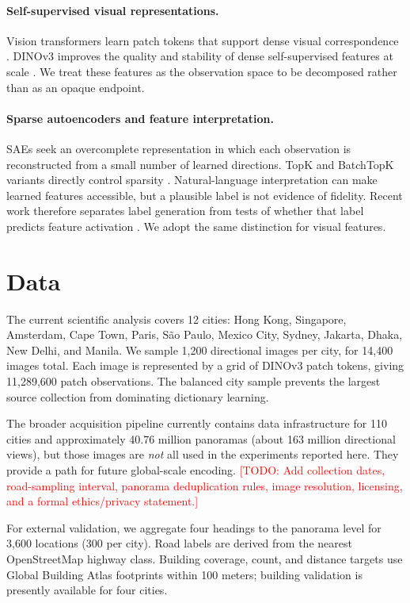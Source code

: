 \documentclass[10pt]{article}
\newcommand{\todo}[1]{\textcolor{red}{[TODO: #1]}}
\begin{document}
\paragraph{Self-supervised visual representations.}
Vision transformers learn patch tokens that support dense visual correspondence
\cite{dosovitskiy2021vit,caron2021dino}. DINOv3 improves the quality and stability
of dense self-supervised features at scale \cite{simeoni2025dinov3}. We treat these
features as the observation space to be decomposed rather than as an opaque endpoint.

\paragraph{Sparse autoencoders and feature interpretation.}
SAEs seek an overcomplete representation in which each observation is reconstructed
from a small number of learned directions. TopK and BatchTopK variants directly
control sparsity \cite{gao2024scaling,bussmann2024batchtopk}. Natural-language
interpretation can make learned features accessible, but a plausible label is not
evidence of fidelity. Recent work therefore separates label generation from tests of
whether that label predicts feature activation \cite{movva2025hypothesaes}. We adopt
the same distinction for visual features.

\section{Data}
The current scientific analysis covers 12 cities: Hong Kong, Singapore, Amsterdam,
Cape Town, Paris, S\~ao Paulo, Mexico City, Sydney, Jakarta, Dhaka, New Delhi, and
Manila. We sample 1,200 directional images per city, for 14,400 images total. Each
image is represented by a grid of DINOv3 patch tokens, giving 11,289,600 patch
observations. The balanced city sample prevents the largest source collection from
dominating dictionary learning.

The broader acquisition pipeline currently contains data infrastructure for 110
cities and approximately 40.76 million panoramas (about 163 million directional
views), but those images are \emph{not} all used in the experiments reported here.
They provide a path for future global-scale encoding. \todo{Add collection dates,
road-sampling interval, panorama deduplication rules, image resolution, licensing,
and a formal ethics/privacy statement.}

For external validation, we aggregate four headings to the panorama level for 3,600
locations (300 per city). Road labels are derived from the nearest OpenStreetMap
highway class. Building coverage, count, and distance targets use Global Building
Atlas footprints within 100 meters; building validation is presently available for
four cities.
\end{document}
